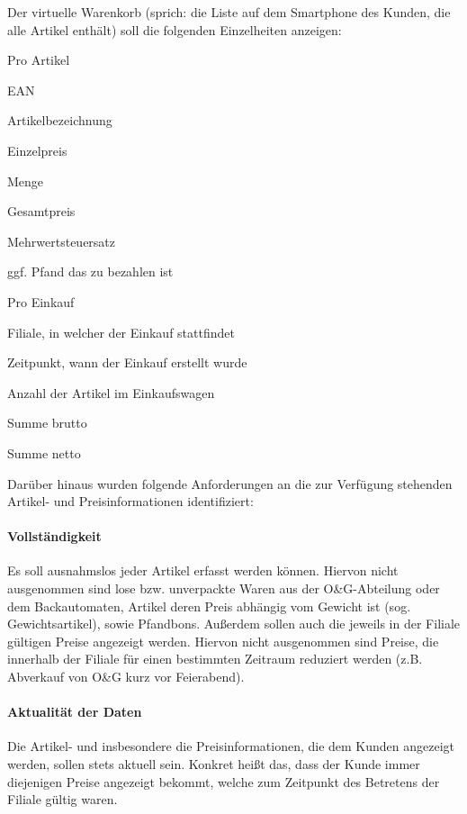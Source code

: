 Der virtuelle Warenkorb (sprich: die Liste auf dem Smartphone des Kunden, die alle Artikel enthält) soll die folgenden Einzelheiten anzeigen:

\begin{seList}
	\item Pro Artikel
	\begin{seList}
		\item EAN
		\item Artikelbezeichnung
		\item Einzelpreis
		\item Menge
		\item Gesamtpreis
		\item Mehrwertsteuersatz
		\item ggf. Pfand das zu bezahlen ist
	\end{seList}
	\item Pro Einkauf
	\begin{seList}
		\item Filiale, in welcher der Einkauf stattfindet
		\item Zeitpunkt, wann der Einkauf erstellt wurde
		\item Anzahl der Artikel im Einkaufswagen
		\item Summe brutto
		\item Summe netto
	\end{seList}
\end{seList}

Darüber hinaus wurden folgende Anforderungen an die zur Verfügung stehenden Artikel- und Preisinformationen identifiziert:
\paragraph{Vollständigkeit}
Es soll ausnahmslos jeder Artikel erfasst werden können. Hiervon nicht ausgenommen sind lose bzw. unverpackte Waren aus der O\&G-Abteilung oder dem Backautomaten, Artikel deren Preis abhängig vom Gewicht ist (sog. Gewichtsartikel), sowie Pfandbons.
Außerdem sollen auch die jeweils in der Filiale gültigen Preise angezeigt werden. Hiervon nicht ausgenommen sind Preise, die innerhalb der Filiale für einen bestimmten Zeitraum reduziert werden (z.B. Abverkauf von O\&G kurz vor Feierabend).

\paragraph{Aktualität der Daten}
Die Artikel- und insbesondere die Preisinformationen, die dem Kunden angezeigt werden, sollen stets aktuell sein. Konkret heißt das, dass der Kunde immer diejenigen Preise angezeigt bekommt, welche zum Zeitpunkt des Betretens der Filiale gültig waren. 

